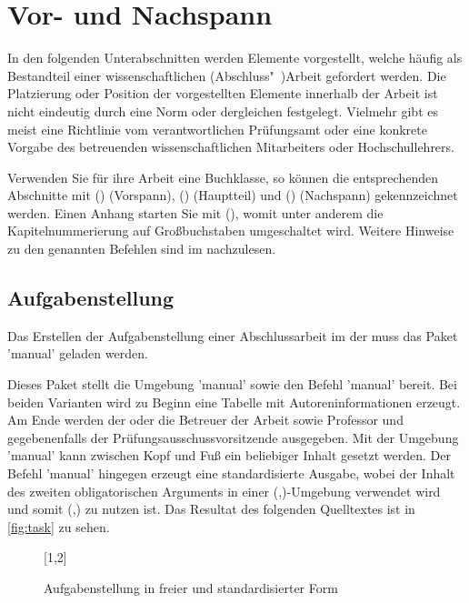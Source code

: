 \documentclass[%
  english,ngerman,%
  cdgeometry=no,DIV=12,automark,%
]{tudscrartcl}
\begin{document}
\section{Vor- und Nachspann}
In den folgenden Unterabschnitten werden Elemente vorgestellt, welche häufig 
als Bestandteil einer wissenschaftlichen (Abschluss"~)Arbeit gefordert werden. 
Die Platzierung oder Position der vorgestellten Elemente innerhalb der Arbeit 
ist nicht eindeutig durch eine Norm oder dergleichen festgelegt. Vielmehr gibt 
es meist eine Richtlinie vom verantwortlichen Prüfungsamt oder eine konkrete 
Vorgabe des betreuenden wissenschaftlichen Mitarbeiters oder Hochschullehrers.

Verwenden Sie für ihre Arbeit eine Buchklasse, so können die entsprechenden 
Abschnitte mit () (Vorspann), 
() (Hauptteil) und 
() (Nachspann) gekennzeichnet werden. 
Einen Anhang starten Sie mit (), womit 
unter anderem die Kapitelnummerierung auf Großbuchstaben umgeschaltet wird. 
Weitere Hinweise zu den genannten Befehlen sind im \scrguide nachzulesen.


\subsection{Aufgabenstellung}
\label{sec:task}%
%
Das Erstellen der Aufgabenstellung einer Abschlussarbeit im \CD der \TnUD muss 
das Paket 'manual' geladen werden.
%
\begin{Preamble}
\usepackage{tudscrsupervisor}

\end{Preamble}
%
Dieses Paket stellt die Umgebung 'manual' sowie den Befehl 
'manual' bereit. Bei beiden Varianten wird zu Beginn eine 
Tabelle mit Autoreninformationen erzeugt. Am Ende werden der oder die Betreuer 
der Arbeit sowie Professor und gegebenenfalls der Prüfungsausschussvorsitzende 
ausgegeben. Mit der Umgebung 'manual' kann zwischen Kopf und 
Fuß ein beliebiger Inhalt gesetzt werden. Der Befehl 'manual' 
hingegen erzeugt eine standardisierte Ausgabe, wobei der Inhalt des zweiten 
obligatorischen Arguments in einer 
(,)-Umgebung 
verwendet wird und somit (,)
zu nutzen ist. Das Resultat des folgenden Quelltextes ist in \autoref{fig:task} 
zu sehen. 
%
\begin{figure}
[1,2]
\caption{Aufgabenstellung in freier und standardisierter Form}
\label{fig:task}
\end{figure}
\end{document}
